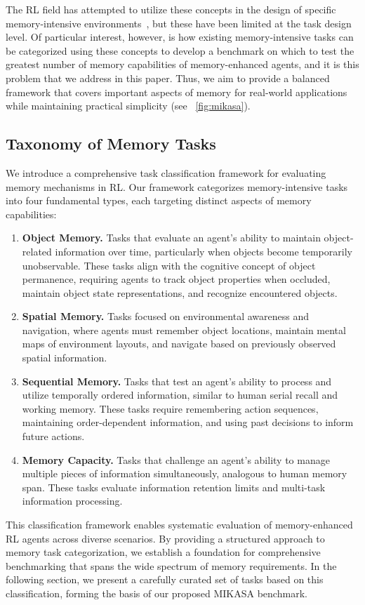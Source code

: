 The RL field has attempted to utilize these concepts in the design of specific memory-intensive environments~\cite{mra,hcam}, but these have been limited at the task design level. Of particular interest, however, is how existing memory-intensive tasks can be categorized using these concepts to develop a benchmark on which to test the greatest number of memory capabilities of memory-enhanced agents, and it is this problem that we address in this paper.
Thus, we aim to provide a balanced framework that covers important aspects of memory for real-world applications while maintaining practical simplicity (see ~\autoref{fig:mikasa}).

\subsection{Taxonomy of Memory Tasks}
\label{sec:mem-class}


We introduce a comprehensive task classification framework for evaluating memory mechanisms in RL. Our framework categorizes memory-intensive tasks into four fundamental types, each targeting distinct aspects of memory capabilities:

\begin{enumerate}
    \item \textbf{Object Memory.} Tasks that evaluate an agent's ability to maintain object-related information over time, particularly when objects become temporarily unobservable. These tasks align with the cognitive concept of object permanence, requiring agents to track object properties when occluded, maintain object state representations, and recognize encountered objects.
    \item \textbf{Spatial Memory.} Tasks focused on environmental awareness and navigation, where agents must remember object locations, maintain mental maps of environment layouts, and navigate based on previously observed spatial information.
    \item \textbf{Sequential Memory.} Tasks that test an agent's ability to process and utilize temporally ordered information, similar to human serial recall and working memory. These tasks require remembering action sequences, maintaining order-dependent information, and using past decisions to inform future actions.
    \item \textbf{Memory Capacity. }Tasks that challenge an agent's ability to manage multiple pieces of information simultaneously, analogous to human memory span. These tasks evaluate information retention limits and multi-task information processing.
\end{enumerate}

This classification framework enables systematic evaluation of memory-enhanced RL agents across diverse scenarios. By providing a structured approach to memory task categorization, we establish a foundation for comprehensive benchmarking that spans the wide spectrum of memory requirements. In the following section, we present a carefully curated set of tasks based on this classification, forming the basis of our proposed MIKASA benchmark.